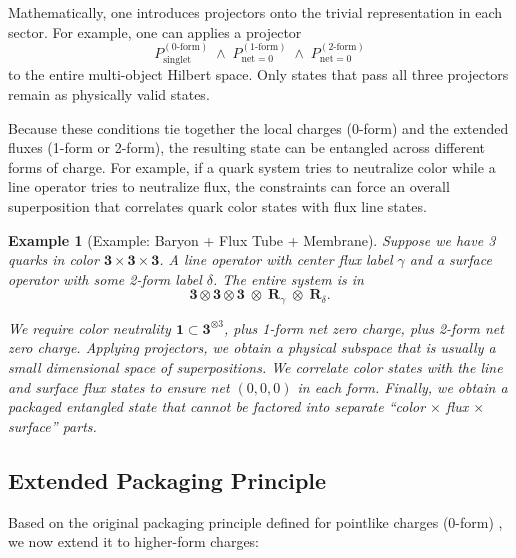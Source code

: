 \documentclass[12pt,a4paper]{article}
\newtheorem{example}{Example}
\begin{document}
Mathematically, one introduces projectors onto the trivial representation in each sector.
For example, one can applies a projector
\[
P^{(0\text{-form})}_{\mathrm{singlet}} \; \wedge\;
P^{(1\text{-form})}_{\mathrm{net}=0} \; \wedge\;
P^{(2\text{-form})}_{\mathrm{net}=0}
\]
to the entire multi-object Hilbert space.
Only states that pass all three projectors remain as physically valid states.


Because these conditions tie together the local charges (0-form) and the extended fluxes (1-form or 2-form), the resulting state can be entangled across different forms of charge.
For example, if a quark system tries to neutralize color while a line operator tries to neutralize flux, the constraints can force an overall superposition that correlates quark color states with flux line states.


\begin{example}[Example: Baryon + Flux Tube + Membrane]
	Suppose we have 3 quarks in color
	$\mathbf{3} \times \mathbf{3} \times \mathbf{3}$.
	A line operator with center flux label $\gamma$ and a surface operator with some 2-form label $\delta$.	
	The entire system is in  
	\[
	\mathbf{3} \otimes \mathbf{3} \otimes \mathbf{3}
	\;\otimes\;
	\mathbf{R}_\gamma\;\otimes\;\mathbf{R}_\delta.
	\]
	
	We require color neutrality $\mathbf{1} \subset \mathbf{3}^{\otimes 3}$, plus 1-form net zero charge, plus 2-form net zero charge.
	Applying projectors, we obtain a physical subspace that is usually a small dimensional space of superpositions.
	We correlate color states with the line and surface flux states to ensure net $(0, 0, 0)$ in each form.
	Finally, we obtain a packaged entangled state that cannot be factored into separate ``color $\times$ flux $\times$ surface'' parts.
\end{example}



\subsection{Extended Packaging Principle}


Based on the original packaging principle defined for pointlike charges (0-form) \cite{MaSPI2025}, we now extend it to higher-form charges:
\end{document}
